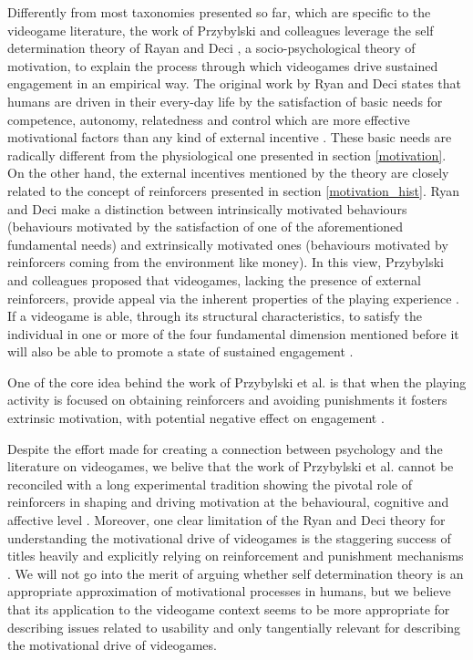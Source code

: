 Differently from most taxonomies presented so far, which are specific to the videogame literature, the work of Przybylski and colleagues leverage the self determination theory of Rayan and Deci \cite{ryan2000self,ryan2006motivational}, a socio-psychological theory of  motivation, to explain the process through which videogames drive sustained engagement \cite{przybylski2010motivational} in an empirical way. The original work by Ryan and Deci states that humans are driven in their every-day life by the satisfaction of basic needs for competence, autonomy, relatedness and control which are more effective motivational factors than any kind of  external incentive \cite{ryan2000self,ryan2006motivational}. These basic needs are radically different from the physiological one presented in section \ref{motivation}. On the other hand, the external incentives mentioned by the theory are closely related to the concept of reinforcers presented in section \ref{motivation_hist}. Ryan and Deci make a distinction between intrinsically motivated behaviours (behaviours motivated by the satisfaction of one of the aforementioned fundamental needs) and extrinsically motivated ones (behaviours motivated by reinforcers coming from the environment like money). In this view, Przybylski and colleagues proposed that videogames, lacking the presence of external reinforcers, provide appeal via the inherent properties of the playing experience \cite{przybylski2010motivational}. If a videogame is able, through its structural characteristics, to satisfy the individual in one or more of the four fundamental dimension mentioned before it will also be able to promote a state of sustained engagement \cite{przybylski2010motivational}.



One of the core idea behind the work of Przybylski et al. is that when the playing activity is focused on obtaining reinforcers and avoiding punishments it fosters extrinsic motivation, with potential negative effect on engagement \cite{przybylski2010motivational}.  

Despite the effort made for creating a connection between psychology and the literature on videogames, we belive that the work of Przybylski et al. cannot be reconciled with a long experimental tradition showing the pivotal role of reinforcers in shaping and driving motivation at the behavioural, cognitive and affective level \cite{skinner1953science,schultz1997neural,berridge2004motivation}. Moreover, one clear limitation of the Ryan and Deci theory for understanding the motivational drive of videogames is the staggering success of titles heavily and explicitly relying on reinforcement and punishment mechanisms \cite{darksouls,candyc}. We will not go into the merit of arguing whether self determination theory is an appropriate approximation of motivational processes in humans, but we believe that its application to the videogame context seems to be more appropriate for describing issues related to usability and only tangentially relevant for describing the motivational drive of videogames.

